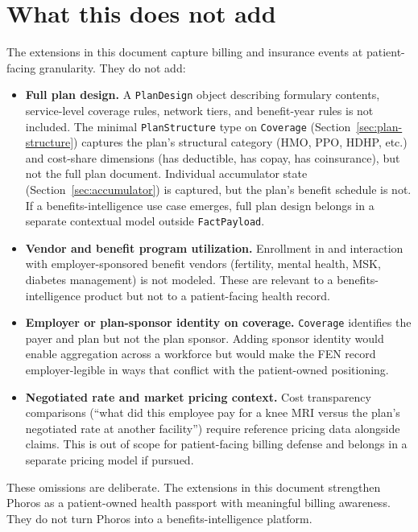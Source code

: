 \documentclass[11pt]{article}
\begin{document}
\section{What this does not add}
\label{sec:what-not-added}

The extensions in this document capture billing and insurance events at
patient-facing granularity. They do not add:

\begin{itemize}

\item \textbf{Full plan design.} A \texttt{PlanDesign} object
describing formulary contents, service-level coverage rules, network
tiers, and benefit-year rules is not included. The minimal
\texttt{PlanStructure} type on \texttt{Coverage}
(Section~\ref{sec:plan-structure}) captures the plan's structural
category (HMO, PPO, HDHP, etc.) and cost-share dimensions (has
deductible, has copay, has coinsurance), but not the full plan
document. Individual accumulator state
(Section~\ref{sec:accumulator}) is captured, but the plan's benefit
schedule is not. If a benefits-intelligence use case emerges, full
plan design belongs in a separate contextual model outside
\texttt{FactPayload}.

\item \textbf{Vendor and benefit program utilization.} Enrollment in and
interaction with employer-sponsored benefit vendors (fertility, mental
health, MSK, diabetes management) is not modeled. These are relevant
to a benefits-intelligence product but not to a patient-facing health
record.

\item \textbf{Employer or plan-sponsor identity on coverage.}
\texttt{Coverage} identifies the payer and plan but not the plan
sponsor. Adding sponsor identity would enable aggregation across a
workforce but would make the FEN record employer-legible in ways that
conflict with the patient-owned positioning.

\item \textbf{Negotiated rate and market pricing context.} Cost
transparency comparisons (``what did this employee pay for a knee MRI
versus the plan's negotiated rate at another facility'') require
reference pricing data alongside claims. This is out of scope for
patient-facing billing defense and belongs in a separate pricing model
if pursued.

\end{itemize}

These omissions are deliberate. The extensions in this document
strengthen Phoros as a patient-owned health passport with meaningful
billing awareness. They do not turn Phoros into a benefits-intelligence
platform.
\end{document}
